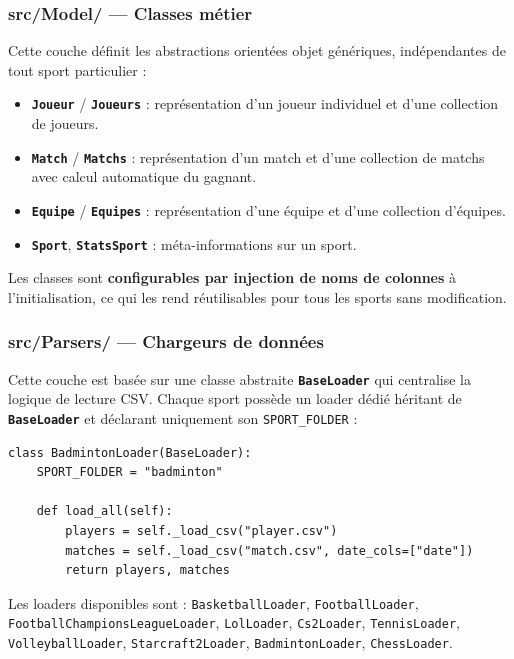 \documentclass[12pt,a4paper]{article}
\newcommand{\code}[1]{\texttt{#1}}
\newcommand{\classe}[1]{\texttt{\textbf{#1}}}
\begin{document}
\subsubsection{src/Model/ --- Classes métier}

Cette couche définit les abstractions orientées objet génériques, indépendantes
de tout sport particulier :

\begin{itemize}
  \item \classe{Joueur} / \classe{Joueurs} : représentation d'un joueur
        individuel et d'une collection de joueurs.
  \item \classe{Match} / \classe{Matchs} : représentation d'un match et
        d'une collection de matchs avec calcul automatique du gagnant.
  \item \classe{Equipe} / \classe{Equipes} : représentation d'une équipe
        et d'une collection d'équipes.
  \item \classe{Sport}, \classe{StatsSport} : méta-informations sur un sport.
\end{itemize}

Les classes sont \textbf{configurables par injection de noms de colonnes} à
l'initialisation, ce qui les rend réutilisables pour tous les sports sans
modification.

\subsubsection{src/Parsers/ --- Chargeurs de données}

Cette couche est basée sur une classe abstraite \classe{BaseLoader} qui
centralise la logique de lecture CSV. Chaque sport possède un loader dédié
héritant de \classe{BaseLoader} et déclarant uniquement son
\code{SPORT\_FOLDER} :

\begin{lstlisting}[caption={Structure minimale d'un loader (exemple Badminton)}]
class BadmintonLoader(BaseLoader):
    SPORT_FOLDER = "badminton"

    def load_all(self):
        players = self._load_csv("player.csv")
        matches = self._load_csv("match.csv", date_cols=["date"])
        return players, matches
\end{lstlisting}

Les loaders disponibles sont : \code{BasketballLoader}, \code{FootballLoader},
\code{FootballChampionsLeagueLoader}, \code{LolLoader}, \code{Cs2Loader},
\code{TennisLoader}, \code{VolleyballLoader}, \code{Starcraft2Loader},
\code{BadmintonLoader}, \code{ChessLoader}.
\end{document}
